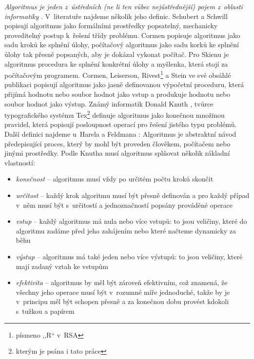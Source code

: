 \documentclass[FP,DP]{tulthesis}
\begin{document}
\textit {Algoritmus je jeden z~ústředních (ne li ten vůbec nejústřednější) pojem z~oblasti informatiky} \citep*{didaktikderinformatik}. V~literatuře najdeme několik jeho definic. Schubert a Schwill \citeyearpar[s.~4]{didaktikderinformatik} popisují algoritmus jako formálními prostředky popsatelný, mechanicky proveditelný postup k~řešení třídy problému. Cormen \citeyearpar[s.~1]{algunlocked} popisuje algoritmus jako sadu kroků ke splnění úlohy, počítačový algoritmus jako sadu korků ke splnění úlohy tak přesně popsaných, aby je dokázal vykonat počítač. Pro Skienu \citeyearpar[s.~3]{algdesignman} je algoritmus procedura ke splnění konkrétní úlohy a myšlenka, která stojí za počítačovým programem. Cormen, Leiserson, Rivest\footnote{písmeno ,,R`` v~RSA} a Stein \citeyearpar[s.~5]{intralg} ve své obsáhlé publikaci popisují algoritmus jako jasně definovanou výpočetní proceduru, která přijímá hodnotu nebo soubor hodnot jako vstup a produkuje hodnotu nebo soubor hodnot jako výstup. Známý informatik  Donald Knuth \citeyearpar[s.~5]{knuth}, tvůrce typografického systému Tex\footnote{kterým je psána i tato práce} definuje algoritmus jako konečnou množinou pravidel, která popisují posloupnost operací pro řešení jistého typu problémů. Další definici najdeme u~Harela a Feldmana \citeyearpar[s.~XII]{spirit}: Algoritmus je abstraktní  návod předepisující proces, který by mohl být proveden člověkem, počítačem nebo jinými prostředky. 
Podle Knutha \citeyearpar[s.~4-6]{knuth} musí algoritmus splňovat několik základní vlastností:
 \begin{itemize}
\setlength\itemsep{0.1em}
\item \textit {konečnost} -- algoritmus musí vždy po určitém počtu kroků skončit
\item \textit {určitost} -- každý krok algoritmu musí být přesně definován a pro každý případ v~něm musí být s~určitostí a jednoznačností popsány prováděné operace
\item \textit {vstup} -- každý algoritmus má nula nebo více vstupů: to jsou veličiny, které do algoritmu zadáme před jeho zahájením nebo které načteme dynamicky za běhu
\item \textit {výstup} -- algoritmus má také jeden nebo více výstupů: to jsou veličiny, které mají zadaný vztah ke vstupům
\item \textit {efektivita} -- algoritmus by měl být zároveň efektivním, což znamená, že všechny jeho operace musí být v~rozumné míře jednoduché, takže by je v~principu měl být schopen přesně a za konečnou dobu provést kdokoli s~tužkou a papírem
\end{itemize}
\end{document}

